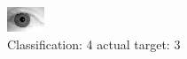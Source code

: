 \begin{figure}[h!]
\begin{center}
\includegraphics[width=0.60\columnwidth]{figures/ID2051_class_4_target_3.png}
\end{center}
\caption{ Classification: 4 actual target: 3}
\label{fig:ID2051_class_4_target_3}
\end{figure}
